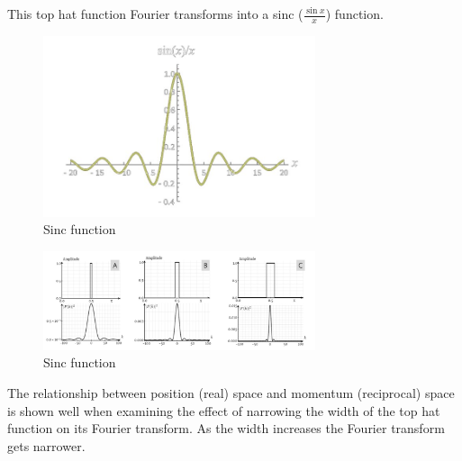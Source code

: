 \documentclass[11pt]{article}
\begin{document}
    This top hat function Fourier transforms into a sinc (\(\frac{\sin x}{x}\)) function.

    \begin{figure}[h]
        \centering
        \includegraphics[width=8cm]{3.jpg}
        \caption{Sinc function}
    \end{figure}

    \begin{figure}[h]
        \centering
        \includegraphics[width=8cm]{4.jpg}
        \caption{Sinc function}
    \end{figure}

    The relationship between position (real) space and momentum (reciprocal) space is shown well when examining
    the effect of narrowing the width of the top hat function on its Fourier transform. As the width increases
    the Fourier transform gets narrower.

    
\end{document}
